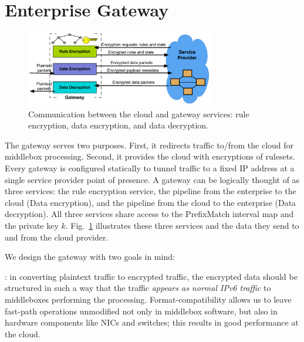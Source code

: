 
\section{Enterprise Gateway}

\label{sec:gateway}

\begin{figure}[t]
  \centering
  \includegraphics[width=3.25in]{fig/gateway2cloud}
  \caption[]{\label{fig:gatewaymeta} Communication between the cloud and gateway services: rule encryption, data encryption, and data decryption.} 
\end{figure}






The gateway serves two purposes. First, it redirects traffic to/from the cloud for middlebox processing. Second, it provides the cloud with encryptions of rulesets.
Every gateway is configured statically to tunnel traffic to a fixed IP address at a single service provider point of presence.
A gateway can be logically thought of as three services: the rule encryption service, the pipeline from the enterprise to the cloud (Data encryption), and the pipeline from the cloud to the enterprise (Data decryption). 
All three services share access to the PrefixMatch interval map and the private key $k$.
Fig.~\ref{fig:gatewaymeta} illustrates  these three services and the data they send to and from the cloud provider.

We design the gateway with two goals in mind: 

: in converting plaintext traffic to encrypted traffic, the encrypted data should be structured in such a way that the traffic {\it appears as normal IPv6 traffic} to middleboxes performing the processing. Format-compatibility allows us to leave fast-path operations unmodified not only in middlebox software, but also in hardware components like NICs and switches; this results in good performance at the cloud.


